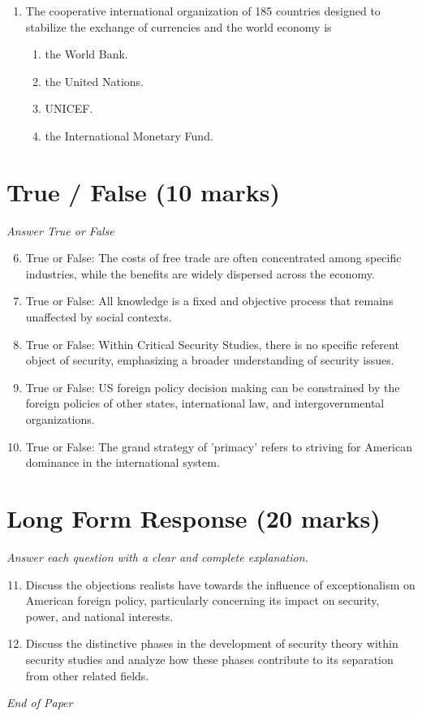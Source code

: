 \documentclass[12pt]{article}
\begin{document}
\begin{enumerate}[label=\arabic*.]
\begin{enumerate}[label=(\alph*)]
    \item It doesn't - the two are fundamentally opposed
    \item Both can be viewed as different means of achieving the same liberal ends
\end{enumerate}
\item The cooperative international organization of 185 countries designed to stabilize the exchange of currencies and the world economy is
\begin{enumerate}[label=(\alph*)]
    \item the World Bank.
    \item the United Nations.
    \item UNICEF.
    \item the International Monetary Fund.
\end{enumerate}
\end{enumerate}

\section*{True / False (10 marks)}
\textit{Answer True or False}
\begin{enumerate}[label=\arabic*.]
\setcounter{enumi}{5}
\item True or False: The costs of free trade are often concentrated among specific industries, while the benefits are widely dispersed across the economy.
\item True or False: All knowledge is a fixed and objective process that remains unaffected by social contexts.
\item True or False: Within Critical Security Studies, there is no specific referent object of security, emphasizing a broader understanding of security issues.
\item True or False: US foreign policy decision making can be constrained by the foreign policies of other states, international law, and intergovernmental organizations.
\item True or False: The grand strategy of 'primacy' refers to striving for American dominance in the international system.
\end{enumerate}

\section*{Long Form Response (20 marks)}
\textit{Answer each question with a clear and complete explanation.}
\begin{enumerate}[label=\arabic*.]
\setcounter{enumi}{10}
\item Discuss the objections realists have towards the influence of exceptionalism on American foreign policy, particularly concerning its impact on security, power, and national interests.
\item Discuss the distinctive phases in the development of security theory within security studies and analyze how these phases contribute to its separation from other related fields.
\end{enumerate}

\vfill
\noindent\textit{End of Paper}
\end{document}
